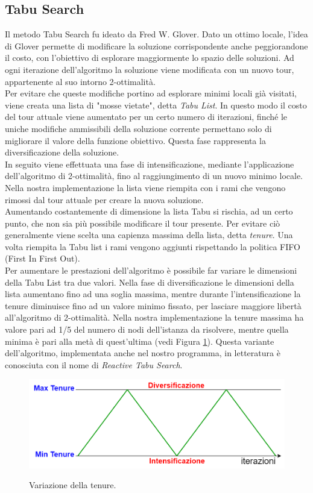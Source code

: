 \subsection{Tabu Search}
Il metodo Tabu Search fu ideato da Fred W. Glover. Dato un ottimo locale, l'idea di Glover permette di modificare la soluzione corrispondente anche peggiorandone il costo, con l'obiettivo di esplorare maggiormente lo spazio delle soluzioni. Ad ogni iterazione dell'algoritmo la soluzione viene modificata con un nuovo tour, appartenente al suo intorno 2-ottimalità.\\
Per evitare che queste modifiche portino ad esplorare minimi locali già visitati, viene creata una lista di "mosse vietate", detta \textit{Tabu List}. In questo modo il costo del tour attuale viene aumentato per un certo numero di iterazioni, finché le uniche modifiche ammissibili della soluzione corrente permettano solo di migliorare il valore della funzione obiettivo. Questa fase rappresenta la diversificazione della soluzione.\\
In seguito viene effettuata una fase di intensificazione, mediante l'applicazione dell'algoritmo di 2-ottimalità, fino al raggiungimento di un nuovo minimo locale.\\
Nella nostra implementazione la lista viene riempita con i rami che vengono rimossi dal tour attuale per creare la nuova soluzione.\\
Aumentando costantemente di dimensione la lista Tabu si rischia, ad un certo punto, che non sia più possibile modificare il tour presente. Per evitare ciò generalmente viene scelta una capienza massima della lista, detta \textit{tenure}. Una volta riempita la Tabu list i rami vengono aggiunti rispettando la politica FIFO (First In First Out).\\
Per aumentare le prestazioni dell'algoritmo è possibile far variare le dimensioni della Tabu List tra due valori. Nella fase di diversificazione le dimensioni della lista aumentano fino ad una soglia massima, mentre durante l'intensificazione la tenure diminuisce fino ad un valore minimo fissato, per lasciare maggiore libertà all'algoritmo di 2-ottimalità. Nella nostra implementazione la tenure massima ha valore pari ad 1/5 del numero di nodi dell'istanza da risolvere, mentre quella minima è pari alla metà di quest'ultima (vedi Figura \ref{tenure}). Questa variante dell'algoritmo, implementata anche nel nostro programma, in letteratura è conosciuta con il nome di \textit{Reactive Tabu Search}.
 \begin{figure}[H] 
\begin{center} 
  \includegraphics[scale=0.35]{Images/tenure}\\ 
  \caption{\footnotesize{Variazione della tenure.}}
  \label{tenure}
\end{center}
\end{figure}
